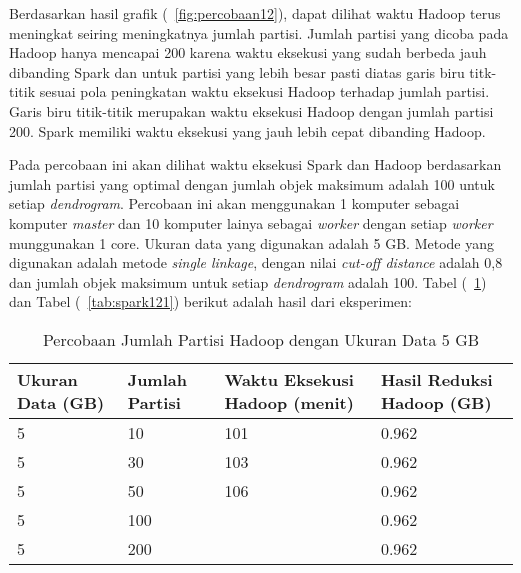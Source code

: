 Berdasarkan hasil grafik (~\ref{fig:percobaan12}), dapat dilihat waktu Hadoop terus meningkat seiring meningkatnya jumlah partisi. Jumlah partisi yang dicoba pada Hadoop hanya mencapai 200 karena waktu eksekusi yang sudah berbeda jauh dibanding Spark dan untuk partisi yang lebih besar pasti diatas garis biru titk-titik sesuai pola peningkatan waktu eksekusi Hadoop terhadap jumlah partisi. Garis biru titik-titik merupakan waktu eksekusi Hadoop dengan jumlah partisi 200. Spark memiliki waktu eksekusi yang jauh lebih cepat dibanding Hadoop. 















Pada percobaan ini akan dilihat waktu eksekusi Spark dan Hadoop berdasarkan jumlah partisi yang optimal dengan jumlah objek maksimum adalah 100 untuk setiap \textit{dendrogram}. Percobaan ini akan menggunakan 1 komputer sebagai komputer \textit{master} dan 10 komputer lainya sebagai \textit{worker} dengan setiap \textit{worker} munggunakan 1 core. Ukuran data yang digunakan adalah 5 GB. Metode yang digunakan adalah metode \textit{single linkage}, dengan nilai \textit{cut-off distance} adalah 0,8 dan jumlah objek maksimum untuk setiap \textit{dendrogram} adalah 100. Tabel (~\ref{tab:spark111}) dan Tabel (~\ref{tab:spark121}) berikut adalah hasil dari eksperimen:





\begin{table}[H] 
	\centering 
	\caption{Percobaan Jumlah Partisi Hadoop dengan Ukuran Data 5 GB}
	\label{tab:spark111}
	\begin{tabular}{|p{3cm}|p{3cm}|p{4cm}|p{4cm}|}
\hline
Ukuran Data (GB) & Jumlah Partisi &  Waktu Eksekusi Hadoop (menit) & Hasil Reduksi Hadoop (GB)\\
\hline
5 & 10 & 101  & 0.962  \\
\hline
5 & 30 & 103  & 0.962  \\
\hline
5 & 50 & 106  & 0.962   \\
\hline
5 & 100 &   & 0.962   \\
\hline
5 & 200 &   & 0.962   \\
\hline


\hline

	\end{tabular} 
\end{table}






